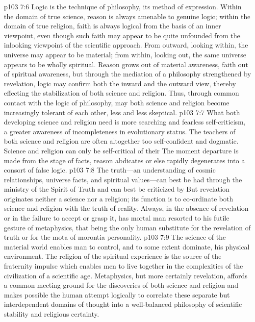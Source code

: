 \vs p103 7:6 Logic is the technique of philosophy, its method of expression. Within the domain of true science, reason is always amenable to genuine logic; within the domain of true religion, faith is always logical from the basis of an inner viewpoint, even though such faith may appear to be quite unfounded from the inlooking viewpoint of the scientific approach. From outward, looking within, the universe may appear to be material; from within, looking out, the same universe appears to be wholly spiritual. Reason grows out of material awareness, faith out of spiritual awareness, but through the mediation of a philosophy strengthened by revelation, logic may confirm both the inward and the outward view, thereby effecting the stabilization of both science and religion. Thus, through common contact with the logic of philosophy, may both science and religion become increasingly tolerant of each other, less and less skeptical.
\vs p103 7:7 What both developing science and religion need is more searching and fearless self\hyp{}criticism, a greater awareness of incompleteness in evolutionary status. The teachers of both science and religion are often altogether too self\hyp{}confident and dogmatic. Science and religion can only be self\hyp{}critical of their  The moment departure is made from the stage of facts, reason abdicates or else rapidly degenerates into a consort of false logic.
\pc \vs p103 7:8 The truth---an understanding of cosmic relationships, universe facts, and spiritual values---can best be had through the ministry of the Spirit of Truth and can best be criticized by  But revelation originates neither a science nor a religion; its function is to co\hyp{}ordinate both science and religion with the truth of reality. Always, in the absence of revelation or in the failure to accept or grasp it, has mortal man resorted to his futile gesture of metaphysics, that being the only human substitute for the revelation of truth or for the mota of morontia personality.\plusone
\vs p103 7:9 The science of the material world enables man to control, and to some extent dominate, his physical environment. The religion of the spiritual experience is the source of the fraternity impulse which enables men to live together in the complexities of the civilization of a scientific age. Metaphysics, but more certainly revelation, affords a common meeting ground for the discoveries of both science and religion and makes possible the human attempt logically to correlate these separate but interdependent domains of thought into a well\hyp{}balanced philosophy of scientific stability and religious certainty.
